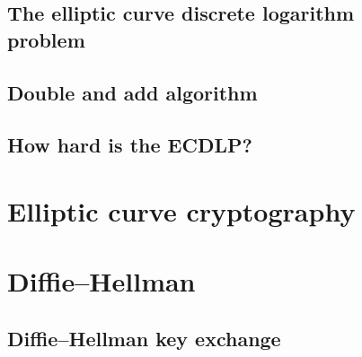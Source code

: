\documentclass[12pt,a4paper]{report}
\begin{document}
	\subsection{The elliptic curve discrete logarithm \\ problem}
	\subsection{Double and add algorithm}
	\subsection{How hard is the ECDLP?}
	\section{Elliptic curve cryptography}
	\section{Diﬃe–Hellman}
	\subsection{Diﬃe–Hellman key exchange}
	\cleardoublepage
	

	\cite{hoffstein2008introduction}
	
	
	
	
	 
	
\end{document}
